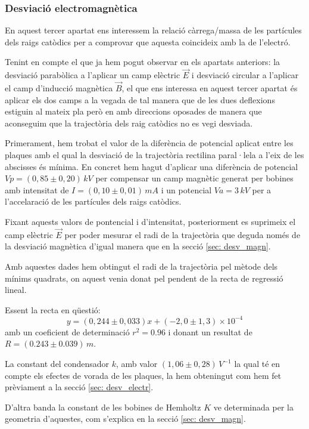 \documentclass[11pt]{article}
\numberwithin{equation}{section}
\numberwithin{figure}{section}
\numberwithin{table}{section}
\begin{document}
\subsubsection{Desviació electromagnètica}\label{sec: desv_em}

En aquest tercer apartat ens interessem la relació càrrega/massa de les partícules dels raigs catòdics per a comprovar que aquesta coincideix amb la de l'electró. 

Tenint en compte el que ja hem pogut observar en els apartats anteriors: la desviació parabòlica a l'aplicar un camp elèctric $\vec{E}$ i desviació circular a l'aplicar el camp d'inducció magnètica $\vec{B}$, el que ens interessa en aquest tercer apartat és aplicar els dos camps a la vegada de tal manera que de les dues deflexions estiguin al mateix pla però en amb direccions oposades de manera que aconseguim que la trajectòria dels raig catòdics no es vegi desviada.

Primerament, hem trobat el valor de la diferència de potencial aplicat entre les plaques amb el qual la desviació de la trajectòria rectilina paral·lela a l'eix de les abscisses és mínima. En concret hem hagut d'aplicar una diferència de potencial $Vp = (0,85 \pm 0,20 )\, kV$ per compensar un camp magnètic generat per bobines amb intensitat de $I = (0,10 \pm 0,01 )\, mA$ i un potencial $Va = 3\, kV$ per a l'accelaració de les partícules dels raigs catòdics.

Fixant aquests valors de pontencial i d'intensitat, posteriorment es suprimeix el camp elèctric $\vec{E}$ per poder mesurar el radi de la trajectòria que deguda només de la desviació magnètica d'igual manera que en la secció \ref{sec: desv_magn}.

Amb aquestes dades hem obtingut el radi de la trajectòria pel mètode dels mínims quadrats, on aquest venia donat pel pendent de la recta de regressió lineal.

Essent la recta en qüestió: 
\begin{equation}
    y=(0,244 \pm 0,033)x + (-2,0 \pm 1,3) \times10^{-4}
\end{equation}  
amb un coeficient de determinació $r^2=0.96$ i  donant un resultat de $R = (0.243 \pm 0.039) \, m$.

La constant del condensador $k$, amb valor $(1,06 \pm 0,28)\, V^{-1}$ la qual té en compte els efectes de vorada de les plaques, la hem obteningut com hem fet prèviament a la secció \ref{sec: desv_electr}. 

D'altra banda la constant de les bobines de Hemholtz $K$ ve determinada per la geometria d'aquestes, com s'explica en la secció \ref{sec: desv_magn}.
\end{document}
